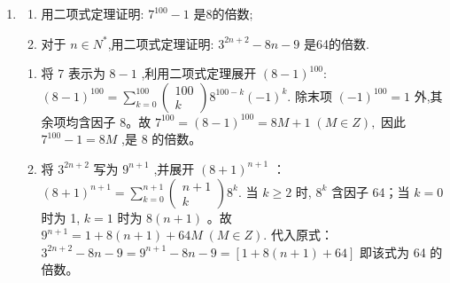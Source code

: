 \begin{enumerate}
\begin{jieda}
    由题意,通项为 ${T}_{k + 1} = {{C}}_{n}^{k}{\left( \sqrt{x}\right) }^{n - k}{\left( \dfrac{1}{2 \cdot  \sqrt[4]{x}}\right) }^{k} = {\left( \dfrac{1}{2}\right) }^{k}{{C}}_{n}^{k}{x}^{\dfrac{{2n} - {3k}}{4}}$ ,
由题意 $2 \times  {\left( \dfrac{1}{2}\right) }^{1}{C}_{n}^{1} = {\left( \dfrac{1}{2}\right) }^{0}{C}_{n}^{0} + {\left( \dfrac{1}{2}\right) }^{2}{C}_{n}^{2}$ ,得 $n = 8$ 或 $n = 1$ (舍去). ${T}_{k + 1} = {\left( \dfrac{1}{2}\right) }^{k}{{C}}_{8}^{k}x\dfrac{{16} - {3k}}{4}$ ,所以当 $k$ 取0、4、8时为有理项,
当 $k = 0$ 时, ${T}_{1} = {\left( \dfrac{1}{2}\right) }^{0}{{C}}_{8}^{0}{x}^{4} = {x}^{4}$ ,
当 $k = 4$ 时, ${T}_{5} = {\left( \dfrac{1}{2}\right) }^{4}{{C}}_{8}^{4}x = \dfrac{35}{8}x$ ,
当 $k = 8$ 时, ${T}_{9} = {\left( \dfrac{1}{2}\right) }^{8}{{C}}_{8}^{8}{x}^{-2} = \dfrac{1}{256}{x}^{-2}$ ,
故展开式中的所有有理项为 ${x^4},\dfrac{35}{8}x$ 和 $\dfrac{1}{256}x^{-2}$.
\end{jieda}


\item 
\begin{enumerate}
    \item 用二项式定理证明: $7^{100}-1$ 是8的倍数;
    \item 对于 $n\in N^{*}$,用二项式定理证明: $3^{2n+2}-8n-9$ 是64的倍数.
\end{enumerate}
\begin{jieda}
    \begin{enumerate}
        \item  将 7 表示为 $8 - 1$ ,利用二项式定理展开
${\left( 8 - 1\right) }^{100} :$
${\left( 8 - 1\right) }^{100} = \mathop{\sum }\limits_{{k = 0}}^{{100}}\left( \begin{matrix} {100} \\  k \end{matrix}\right) {8}^{{100} - k}{\left( -1\right) }^{k}.$
除末项 ${\left( -1\right) }^{100} = 1$ 外,其余项均含因子 8。故
${7}^{100} = {\left( 8 - 1\right) }^{100} = {8M} + 1\;\left( {M \in  Z}\right) ,$
因此 ${7}^{100} - 1 = {8M}$ ,是 8 的倍数。
    \item 将 ${3}^{{2n} + 2}$ 写为 ${9}^{n + 1}$ ,并展开 ${\left( 8 + 1\right) }^{n + 1}$ ：
${\left( 8 + 1\right) }^{n + 1} = \mathop{\sum }\limits_{{k = 0}}^{{n + 1}}\left( \begin{matrix} n + 1 \\  k \end{matrix}\right) {8}^{k}.$
当 $k \geq  2$ 时, ${8}^{k}$ 含因子 64；当 $k = 0$ 时为 1, $k = 1$
时为 $8\left( {n + 1}\right)$ 。故
${9}^{n + 1} = 1 + 8\left( {n + 1}\right)  + {64M}\;\left( {M \in  Z}\right) .$
代入原式：
${3}^{{2n} + 2} - {8n} - 9 = {9}^{n + 1} - {8n} - 9 = \left\lbrack  {1 + 8\left( {n + 1}\right)  + {64}}\right\rbrack$
即该式为 64 的倍数。
    \end{enumerate}
\end{jieda}




\end{enumerate}
\clearpage


